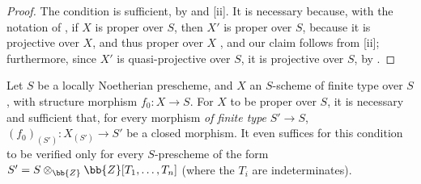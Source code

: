 \begin{proof}
The condition is sufficient, by  and [ii].
It is necessary because, with the notation of , if $X$ is proper over $S$, then $X'$ is proper over $S$, because it is projective over $X$, and thus proper over $X$ , and our claim follows from [ii]; furthermore, since $X'$ is quasi-projective over $S$, it is projective over $S$, by .
\end{proof}

\begin{corollary}[5.6.3]
\label{II.5.6.3}
Let $S$ be a locally Noetherian prescheme, and $X$ an $S$-scheme of finite type over $S$, with structure morphism $f_0:X\to S$.
For $X$ to be proper over $S$, it is necessary and sufficient that, for every morphism \emph{of finite type} $S'\to S$, $(f_0)_{(S')}:X_{(S')}\to S'$ be a closed morphism.
It even suffices for this condition to be verified only for every $S$-prescheme of the form $S'=S\otimes_\bb{Z}\bb{Z}[T_1,\ldots,T_n]$ (where the $T_i$ are indeterminates).
\end{corollary}

